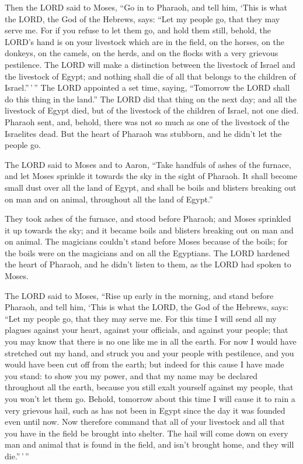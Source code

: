 Then the LORD said to Moses, ``Go in to Pharaoh, and tell
him, `This is what the LORD, the God of the Hebrews, says: ``Let my
people go, that they may serve me.  For if you refuse to let
them go, and hold them still,  behold, the LORD's hand is on
your livestock which are in the field, on the horses, on the donkeys, on
the camels, on the herds, and on the flocks with a very grievous
pestilence.  The LORD will make a distinction between the
livestock of Israel and the livestock of Egypt; and nothing shall die of
all that belongs to the children of Israel.''\,'\,''  The
LORD appointed a set time, saying, ``Tomorrow the LORD shall do this
thing in the land.''  The LORD did that thing on the next
day; and all the livestock of Egypt died, but of the livestock of the
children of Israel, not one died.  Pharaoh sent, and,
behold, there was not so much as one of the livestock of the Israelites
dead. But the heart of Pharaoh was stubborn, and he didn't let the
people go.

 The LORD said to Moses and to Aaron, ``Take handfuls of
ashes of the furnace, and let Moses sprinkle it towards the sky in the
sight of Pharaoh.  It shall become small dust over all the
land of Egypt, and shall be boils and blisters breaking out on man and
on animal, throughout all the land of Egypt.''

 They took ashes of the furnace, and stood before Pharaoh;
and Moses sprinkled it up towards the sky; and it became boils and
blisters breaking out on man and on animal.  The magicians
couldn't stand before Moses because of the boils; for the boils were on
the magicians and on all the Egyptians.  The LORD hardened
the heart of Pharaoh, and he didn't listen to them, as the LORD had
spoken to Moses.

 The LORD said to Moses, ``Rise up early in the morning,
and stand before Pharaoh, and tell him, `This is what the LORD, the God
of the Hebrews, says: ``Let my people go, that they may serve me.
 For this time I will send all my plagues against your
heart, against your officials, and against your people; that you may
know that there is no one like me in all the earth.  For
now I would have stretched out my hand, and struck you and your people
with pestilence, and you would have been cut off from the earth;
 but indeed for this cause I have made you stand: to show
you my power, and that my name may be declared throughout all the earth,
 because you still exalt yourself against my people, that
you won't let them go.  Behold, tomorrow about this time I
will cause it to rain a very grievous hail, such as has not been in
Egypt since the day it was founded even until now.  Now
therefore command that all of your livestock and all that you have in
the field be brought into shelter. The hail will come down on every man
and animal that is found in the field, and isn't brought home, and they
will die.''\,'\,''

